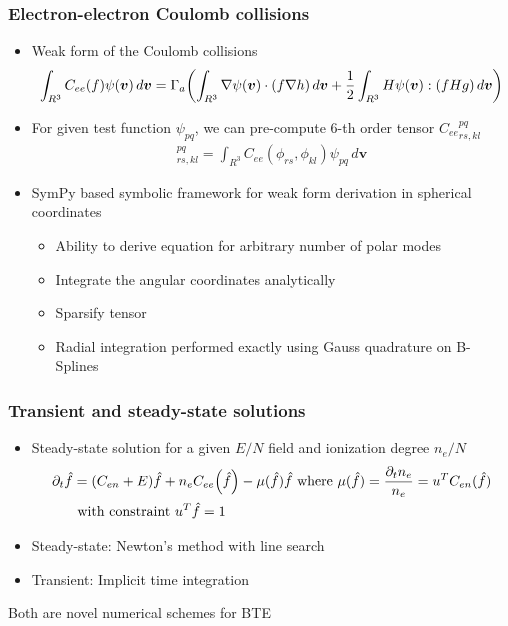 \documentclass[mathserif, aspectratio=169]{beamer}
\newcommand{\vect}[1]{\boldsymbol{#1}}
\newcommand{\of}[1]{\mleft( #1 \mright)}
\newcommand{\diff}[1]{\, d#1}
\begin{document}
\begin{frame}
	\frametitle{Electron-electron Coulomb collisions}
	\begin{itemize}
		\item Weak form of the Coulomb collisions
		\begin{align}
			\int_{R^3} C_{ee}(f) \psi(\vect{v})\diff{\vect{v}} = \Gamma_a \of{\int_{R^3} \nabla \psi\of{\vect{v}} \cdot (f \nabla h ) \diff{\vect{v}}  + \frac{1}{2} \int_{R^3} H\psi\of{\vect{v}} : \of{f H g} \diff{\vect{v}}} 
		\end{align}
		\item For given test function $\psi_{pq}$, we can pre-compute 6-th order tensor ${C_{ee}}_{rs,kl}^{pq}$
		\begin{align}
			[C_{ee}]_{rs,kl}^{pq} = \int_{R^3} C_{ee}(\phi_{rs}, \phi_{kl}) \psi_{pq} \diff{\vect{v}} 
		\end{align}
		\item SymPy based symbolic framework for weak form derivation in spherical coordinates
		\begin{itemize}
			\item Ability to derive equation for arbitrary number of polar modes
			\item Integrate the angular coordinates analytically %
			\item Sparsify tensor
			\item Radial integration performed exactly using Gauss quadrature on B-Splines
		\end{itemize}
	\end{itemize}
\end{frame}

\begin{frame}
	\frametitle{Transient and steady-state solutions}
	\begin{itemize}
		\item Steady-state solution for a given $E/N$ field and ionization degree $n_e/N$ 
		\begin{align}
			\partial_t {\hat{f}} &=(C_{en}+E)\hat{f} + n_e C_{ee}\of{\hat{f}} - \mu(\hat{f}) \hat{f} \text{ where } \mu(\hat{f}) = \frac{\partial_t n_e}{n_e} = u^T C_{en}(\hat{f})\\
			&\text{ with constraint } u^T \hat{f} = 1 \nonumber 
		\end{align}
		\item Steady-state: Newton's method with line search
		\item Transient: Implicit time integration
	\end{itemize}
	Both are novel numerical schemes for BTE
\end{frame}
\end{document}
